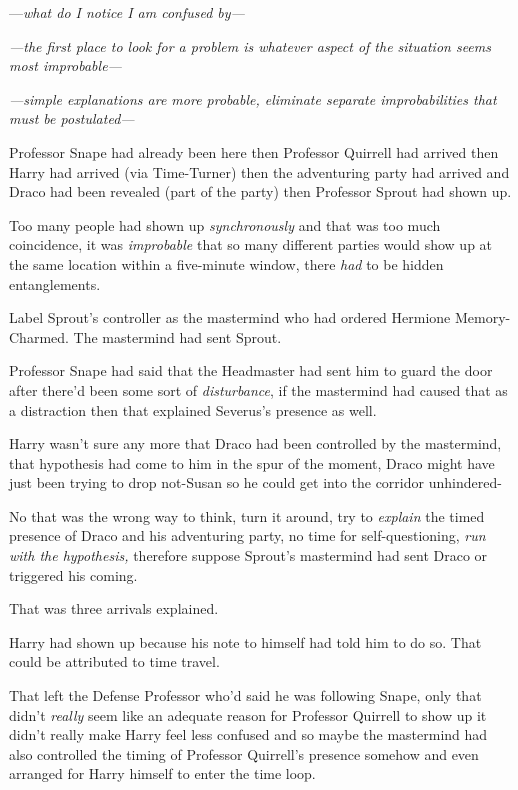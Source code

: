 ---\emph{what do I notice I am confused by---}

\emph{---the first place to look for a problem is whatever aspect of the 
situation seems most improbable---}

\emph{---simple explanations are more probable, eliminate separate 
improbabilities that must be postulated---}

Professor Snape had already been here then Professor Quirrell had arrived then 
Harry had arrived (via Time-Turner) then the adventuring party had arrived and 
Draco had been revealed (part of the party) then Professor Sprout had shown up.

Too many people had shown up \emph{synchronously} and that was too much 
coincidence, it was \emph{improbable} that so many different parties would show 
up at the same location within a five-minute window, there \emph{had} to be 
hidden entanglements.

Label Sprout's controller as the mastermind who had ordered Hermione 
Memory-Charmed. The mastermind had sent Sprout.

Professor Snape had said that the Headmaster had sent him to guard the door 
after there'd been some sort of \emph{disturbance}, if the mastermind had 
caused that as a distraction then that explained Severus's presence as well.

Harry wasn't sure any more that Draco had been controlled by the mastermind, 
that hypothesis had come to him in the spur of the moment, Draco might have 
just been trying to drop not-Susan so he could get into the corridor unhindered-

No that was the wrong way to think, turn it around, try to \emph{explain} the 
timed presence of Draco and his adventuring party, no time for 
self-questioning, \emph{run with the hypothesis,} therefore suppose Sprout's 
mastermind had sent Draco or triggered his coming.

That was three arrivals explained.

Harry had shown up because his note to himself had told him to do so. That 
could be attributed to time travel.

That left the Defense Professor who'd said he was following Snape, only that 
didn't \emph{really} seem like an adequate reason for Professor Quirrell to 
show up it didn't really make Harry feel less confused and so maybe the 
mastermind had also controlled the timing of Professor Quirrell's presence 
somehow and even arranged for Harry himself to enter the time loop.

